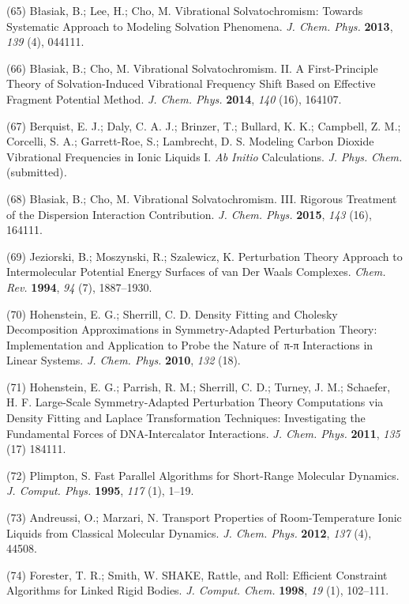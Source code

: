 \documentclass[]{article}
\begin{document}
(65) Błasiak, B.; Lee, H.; Cho, M. Vibrational Solvatochromism: Towards Systematic Approach to Modeling Solvation Phenomena. \emph{J. Chem.  Phys.} \textbf{2013}, \emph{139} (4), 044111.

(66) Błasiak, B.; Cho, M. Vibrational Solvatochromism. II. A First-Principle Theory of Solvation-Induced Vibrational Frequency Shift Based on Effective Fragment Potential Method. \emph{J. Chem. Phys.}  \textbf{2014}, \emph{140} (16), 164107.

(67) Berquist, E. J.; Daly, C. A. J.; Brinzer, T.; Bullard, K. K.; Campbell, Z. M.; Corcelli, S. A.; Garrett-Roe, S.; Lambrecht, D. S.  Modeling Carbon Dioxide Vibrational Frequencies in Ionic Liquids I.  \emph{Ab Initio} Calculations. \emph{J.} \emph{Phys.} \emph{Chem.}  (submitted)\emph{.}

(68) Błasiak, B.; Cho, M. Vibrational Solvatochromism. III. Rigorous Treatment of the Dispersion Interaction Contribution. \emph{J. Chem.  Phys.} \textbf{2015}, \emph{143} (16), 164111.

(69) Jeziorski, B.; Moszynski, R.; Szalewicz, K. Perturbation Theory Approach to Intermolecular Potential Energy Surfaces of van Der Waals Complexes. \emph{Chem. Rev.} \textbf{1994}, \emph{94} (7), 1887--1930.

(70) Hohenstein, E. G.; Sherrill, C. D. Density Fitting and Cholesky Decomposition Approximations in Symmetry-Adapted Perturbation Theory: Implementation and Application to Probe the Nature of\, π-π Interactions in Linear Systems. \emph{J. Chem. Phys.} \textbf{2010}, \emph{132} (18).

(71) Hohenstein, E. G.; Parrish, R. M.; Sherrill, C. D.; Turney, J. M.; Schaefer, H. F. Large-Scale Symmetry-Adapted Perturbation Theory Computations via Density Fitting and Laplace Transformation Techniques: Investigating the Fundamental Forces of DNA-Intercalator Interactions.  \emph{J. Chem. Phys.} \textbf{2011}, \emph{135} (17) 184111.

(72) Plimpton, S. Fast Parallel Algorithms for Short-Range Molecular Dynamics. \emph{J. Comput. Phys.} \textbf{1995}, \emph{117} (1), 1--19.

(73) Andreussi, O.; Marzari, N. Transport Properties of Room-Temperature Ionic Liquids from Classical Molecular Dynamics. \emph{J. Chem. Phys.}  \textbf{2012}, \emph{137} (4), 44508.

(74) Forester, T. R.; Smith, W. SHAKE, Rattle, and Roll: Efficient Constraint Algorithms for Linked Rigid Bodies. \emph{J. Comput. Chem.}  \textbf{1998}, \emph{19} (1), 102--111.
\end{document}
